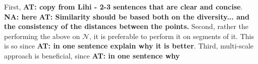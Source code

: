 \documentclass[10pt,twocolumn,letterpaper]{article}
\newcommand{\colornote}[3]{{\color{#1}\bf{#2: #3}\normalfont}}
\newcommand{\colornote}[3]{}
\newcommand {\ayellet}[1]{\colornote{blue}{AT}{#1}}
\newcommand {\nadav}[1]{\colornote{red}{NA}{#1}}
\begin{document}
First, \ayellet{copy from Lihi - 2-3 sentences that are clear and concise}.
\nadav{here}
\ayellet{Similarity should be based both on the diversity... and the consistency of the distances between the points.}
Second, rather the performing the above on $\mathcal{N}$, it is preferable to perform it on segments of it.
This is so since \ayellet{in one sentence explain why it is better}.
Third, multi-scale approach is beneficial, since \ayellet{in one sentence why}
\end{document}
